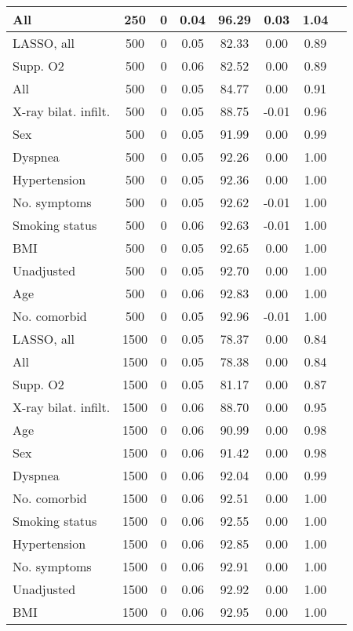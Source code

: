 \documentclass{article}
\begin{document}
{\begin{longtable}{lccccccc}
All & 250 & 0 & 0.04 & 96.29 & 0.03 & 1.04\\ \midrule
LASSO, all & 500 & 0 & 0.05 & 82.33 & 0.00 & 0.89\\
Supp. O2 & 500 & 0 & 0.06 & 82.52 & 0.00 & 0.89\\
All & 500 & 0 & 0.05 & 84.77 & 0.00 & 0.91\\
X-ray bilat. infilt. & 500 & 0 & 0.05 & 88.75 & -0.01 & 0.96\\
Sex & 500 & 0 & 0.05 & 91.99 & 0.00 & 0.99\\
Dyspnea & 500 & 0 & 0.05 & 92.26 & 0.00 & 1.00\\
Hypertension & 500 & 0 & 0.05 & 92.36 & 0.00 & 1.00\\
No. symptoms & 500 & 0 & 0.05 & 92.62 & -0.01 & 1.00\\
Smoking status & 500 & 0 & 0.06 & 92.63 & -0.01 & 1.00\\
BMI & 500 & 0 & 0.05 & 92.65 & 0.00 & 1.00\\
Unadjusted & 500 & 0 & 0.05 & 92.70 & 0.00 & 1.00\\
Age & 500 & 0 & 0.06 & 92.83 & 0.00 & 1.00\\
No. comorbid & 500 & 0 & 0.05 & 92.96 & -0.01 & 1.00\\ \midrule
LASSO, all & 1500 & 0 & 0.05 & 78.37 & 0.00 & 0.84\\
All & 1500 & 0 & 0.05 & 78.38 & 0.00 & 0.84\\
Supp. O2 & 1500 & 0 & 0.05 & 81.17 & 0.00 & 0.87\\
X-ray bilat. infilt. & 1500 & 0 & 0.06 & 88.70 & 0.00 & 0.95\\
Age & 1500 & 0 & 0.06 & 90.99 & 0.00 & 0.98\\
Sex & 1500 & 0 & 0.06 & 91.42 & 0.00 & 0.98\\
Dyspnea & 1500 & 0 & 0.06 & 92.04 & 0.00 & 0.99\\
No. comorbid & 1500 & 0 & 0.06 & 92.51 & 0.00 & 1.00\\
Smoking status & 1500 & 0 & 0.06 & 92.55 & 0.00 & 1.00\\
Hypertension & 1500 & 0 & 0.06 & 92.85 & 0.00 & 1.00\\
No. symptoms & 1500 & 0 & 0.06 & 92.91 & 0.00 & 1.00\\
Unadjusted & 1500 & 0 & 0.06 & 92.92 & 0.00 & 1.00\\
BMI & 1500 & 0 & 0.06 & 92.95 & 0.00 & 1.00\\\bottomrule
\hline
\end{longtable}
}
\end{document}
